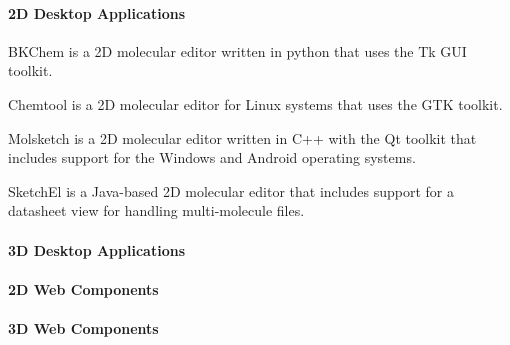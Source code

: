 \paragraph{2D Desktop Applications}

BKChem is a 2D molecular editor written in python that uses the Tk GUI toolkit.

Chemtool is a 2D molecular editor for Linux systems that uses the GTK toolkit.

Molsketch is a 2D molecular editor written in C++ with the Qt toolkit that includes support for the Windows and Android operating systems.

SketchEl is a Java-based 2D molecular editor that includes support for a datasheet view for handling multi-molecule files.

\paragraph{3D Desktop Applications}

\paragraph{2D Web Components}

\paragraph{3D Web Components}